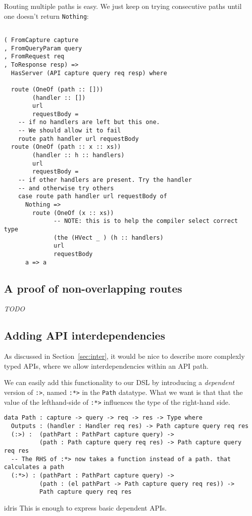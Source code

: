 \documentclass[12pt,a4paper]{article}
\begin{document}
Routing multiple paths is easy. We just keep on trying consecutive paths until one
doesn't return \texttt{Nothing}:

\begin{verbatim}

( FromCapture capture
, FromQueryParam query
, FromRequest req
, ToResponse resp) =>
  HasServer (API capture query req resp) where

  route (OneOf (path :: []))
        (handler :: [])
        url
        requestBody =
    -- if no handlers are left but this one.
    -- We should allow it to fail
    route path handler url requestBody
  route (OneOf (path :: x :: xs))
        (handler :: h :: handlers)
        url
        requestBody =
    -- if other handlers are present. Try the handler
    -- and otherwise try others
    case route path handler url requestBody of
      Nothing =>
        route (OneOf (x :: xs))
              -- NOTE: this is to help the compiler select correct type
              (the (HVect _ ) (h :: handlers)
              url
              requestBody
      a => a
\end{verbatim}
\subsection{A proof of non-overlapping routes}
\emph{TODO}
\subsection{Adding API interdependencies}
As discussed in Section~\ref{sec:inter}, it would be nice to describe more complexly typed APIs, where we allow interdependencies within an API path.

We can easily add this functionality to our DSL by introducing a \emph{dependent} version of \texttt{:>}, named
\texttt{:*>} in the \texttt{Path} datatype.
What we want is that that the value of the lefthand-side of \texttt{:*>} influences the type of the right-hand side.
\begin{verbatim}
data Path : capture -> query -> req -> res -> Type where
  Outputs : (handler : Handler req res) -> Path capture query req res
  (:>) :  (pathPart : PathPart capture query) ->
          (path : Path capture query req res) -> Path capture query req res
  -- The RHS of :*> now takes a function instead of a path. that calculates a path
  (:*>) : (pathPart : PathPart capture query) ->
          (path : (el pathPart -> Path capture query req res)) ->
          Path capture query req res
\end{verbatim}{idris}
This is enough to express basic dependent APIs.
\end{document}
